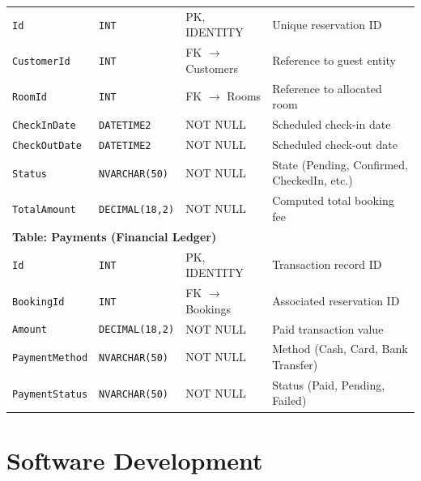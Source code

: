 \documentclass[11pt,a4paper]{article}
\begin{document}
\begin{table}[H]
\begin{tabularx}{\textwidth}{l l l X}
\texttt{Id} & \texttt{INT} & PK, IDENTITY & Unique reservation ID \\
\texttt{CustomerId} & \texttt{INT} & FK $\rightarrow$ Customers & Reference to guest entity \\
\texttt{RoomId} & \texttt{INT} & FK $\rightarrow$ Rooms & Reference to allocated room \\
\texttt{CheckInDate} & \texttt{DATETIME2} & NOT NULL & Scheduled check-in date \\
\texttt{CheckOutDate} & \texttt{DATETIME2} & NOT NULL & Scheduled check-out date \\
\texttt{Status} & \texttt{NVARCHAR(50)} & NOT NULL & State (Pending, Confirmed, CheckedIn, etc.) \\
\texttt{TotalAmount} & \texttt{DECIMAL(18,2)} & NOT NULL & Computed total booking fee \\
\midrule
\multicolumn{4}{l}{\textbf{Table: Payments (Financial Ledger)}} \\
\texttt{Id} & \texttt{INT} & PK, IDENTITY & Transaction record ID \\
\texttt{BookingId} & \texttt{INT} & FK $\rightarrow$ Bookings & Associated reservation ID \\
\texttt{Amount} & \texttt{DECIMAL(18,2)} & NOT NULL & Paid transaction value \\
\texttt{PaymentMethod} & \texttt{NVARCHAR(50)} & NOT NULL & Method (Cash, Card, Bank Transfer) \\
\texttt{PaymentStatus} & \texttt{NVARCHAR(50)} & NOT NULL & Status (Paid, Pending, Failed) \\
\bottomrule
\end{tabularx}
\end{table}

\section{Software Development}
\end{document}
